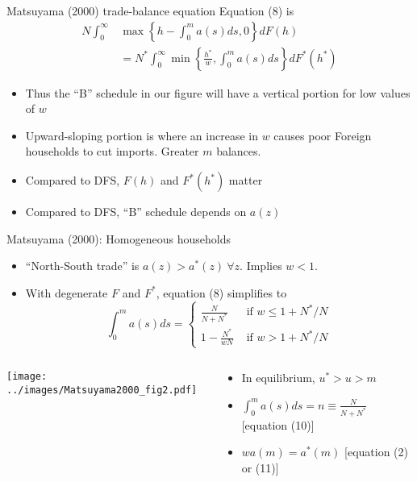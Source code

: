 \documentclass[10pt,notes=hide]{beamer}
\begin{document}
\begin{frame}{Matsuyama (2000) trade-balance equation}
Equation (8) is
\begin{align*} 
N \int_{0}^{\infty} &\max \left\{h-\int_{0}^{m}a(s) ds,0\right\} dF(h) 
\\ 
&= 
N^{*} \int_{0}^{\infty} \min \left\{\frac{h^*}{w},\int_{0}^{m}a(s) ds\right\} dF^{*}(h^*)
\end{align*}
\vspace{-4mm}
\begin{itemize}
	\item Thus the ``B'' schedule in our figure will have a vertical portion for low values of $w$
	\item Upward-sloping portion is where an increase in $w$ causes poor Foreign households to cut imports. Greater $m$ balances.
	\item Compared to DFS, $F(h)$ and $F^*(h^*)$ matter
	\item Compared to DFS, ``B'' schedule depends on $a(z)$
\end{itemize}
\end{frame}
\begin{frame}{Matsuyama (2000): Homogeneous households}
\begin{itemize}
	\item ``North-South trade'' is $a(z)>a^*(z) \ \forall z$. Implies $w<1$.
	\item With degenerate $F$ and $F^*$, equation (8) simplifies to
		\begin{equation*}
		\int_{0}^{m}a(s) ds = \left\{ 
		\begin{array}{lc}
		\frac{N}{N+N^*} & \text{ if } w \leq 1 + N^*/N \\
		1 - \frac{N^*}{wN} & \text{ if } w > 1 + N^*/N
		\end{array} \right.
		\end{equation*}
\end{itemize}
\begin{columns}
\begin{column}{.49\textwidth}
\texttt{[image: ../images/Matsuyama2000\_fig2.pdf]}
\end{column}
\begin{column}{.49\textwidth}
\begin{itemize}
	\item In equilibrium, $u^*>u>m$
	\item $\int_{0}^{m}a(s) ds = n \equiv \frac{N}{N+N^*}$ [equation (10)]
	\item $w a(m) = a^{*}(m)$ [equation (2) or (11)]
\end{itemize}
\end{column}
\end{columns}
\end{frame}
\end{document}
